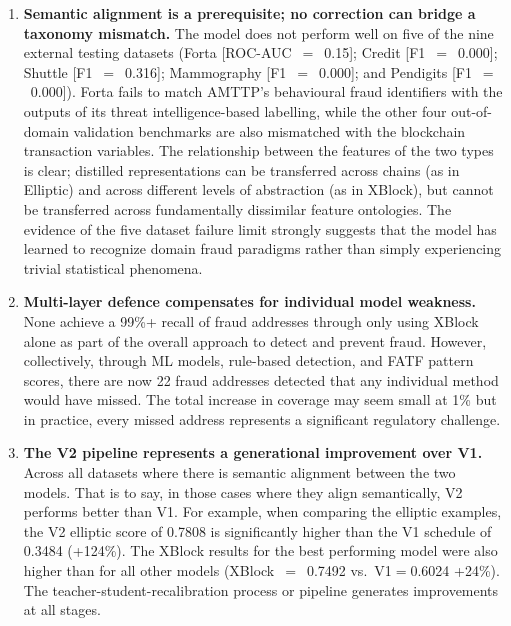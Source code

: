\documentclass[journal]{IEEEtran}
\begin{document}
\begin{enumerate}
\item \textbf{Semantic alignment is a prerequisite; no correction can bridge a taxonomy mismatch.} The model does not perform well on five of the nine external testing datasets (Forta [ROC-AUC~$=$~0.15]; Credit [F1~$=$~0.000]; Shuttle [F1~$=$~0.316]; Mammography [F1~$=$~0.000]; and Pendigits [F1~$=$~0.000]). Forta fails to match AMTTP's behavioural fraud identifiers with the outputs of its threat intelligence-based labelling, while the other four out-of-domain validation benchmarks are also mismatched with the blockchain transaction variables. The relationship between the features of the two types is clear; distilled representations can be transferred across chains (as in Elliptic) and across different levels of abstraction (as in XBlock), but cannot be transferred across fundamentally dissimilar feature ontologies. The evidence of the five dataset failure limit strongly suggests that the model has learned to recognize domain fraud paradigms rather than simply experiencing trivial statistical phenomena.

\item \textbf{Multi-layer defence compensates for individual model weakness.} None achieve a 99\%+ recall of fraud addresses through only using XBlock alone as part of the overall approach to detect and prevent fraud. However, collectively, through ML models, rule-based detection, and FATF pattern scores, there are now 22 fraud addresses detected that any individual method would have missed. The total increase in coverage may seem small at 1\% but in practice, every missed address represents a significant regulatory challenge.

\item \textbf{The V2 pipeline represents a generational improvement over V1.} Across all datasets where there is semantic alignment between the two models. That is to say, in those cases where they align semantically, V2 performs better than V1. For example, when comparing the elliptic examples, the V2 elliptic score of 0.7808 is significantly higher than the V1 schedule of 0.3484 (+124\%). The XBlock results for the best performing model were also higher than for all other models (XBlock~$=$~0.7492 vs.\ V1$=$0.6024 +24\%). The teacher-student-recalibration process or pipeline generates improvements at all stages.


\end{enumerate}
\end{document}
